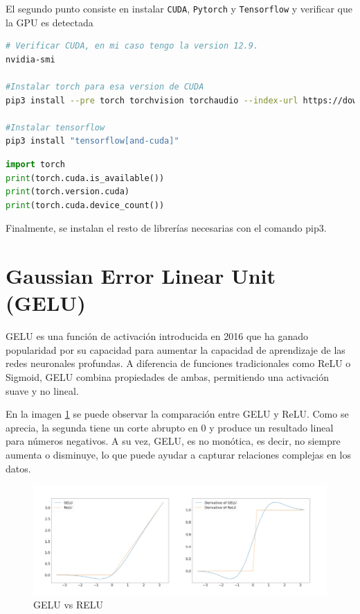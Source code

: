 \documentclass[11pt]{book}
\begin{document}
El segundo punto consiste en instalar \texttt{CUDA}, \texttt{Pytorch} y \texttt{Tensorflow} y verificar que la GPU es detectada
\begin{lstlisting}[language=bash]
# Verificar CUDA, en mi caso tengo la version 12.9.
nvidia-smi

#Instalar torch para esa version de CUDA
pip3 install --pre torch torchvision torchaudio --index-url https://download.pytorch.org/whl/nightly/cu129

#Instalar tensorflow
pip3 install "tensorflow[and-cuda]"

\end{lstlisting}

\begin{lstlisting}[language=Python]
import torch
print(torch.cuda.is_available())
print(torch.version.cuda)
print(torch.cuda.device_count())
\end{lstlisting}

Finalmente, se instalan el resto de librerías necesarias con el comando pip3.


\section{Gaussian Error Linear Unit (GELU)} \label{sec:gelu}
GELU es una función de activación introducida en 2016 que ha ganado popularidad por su capacidad para aumentar la capacidad de aprendizaje de las redes neuronales profundas. A diferencia de funciones tradicionales como ReLU o Sigmoid, GELU combina propiedades de ambas, permitiendo una activación suave y no lineal. 

En la imagen \ref{fig:placeholder32} se puede observar la comparación entre GELU y ReLU. Como se aprecia, la segunda tiene un corte abrupto en 0 y produce un resultado lineal para números negativos. A su vez, GELU, es no monótica, es decir, no siempre aumenta o disminuye, lo que puede ayudar a capturar relaciones complejas en los datos.

\begin{figure}[h]
    \centering
    \includegraphics[width=0.5\linewidth]{img/gelu.png}
    \caption{GELU vs RELU \parencite{carr2025gelu}}
    \label{fig:placeholder32}
\end{figure}
\end{document}
